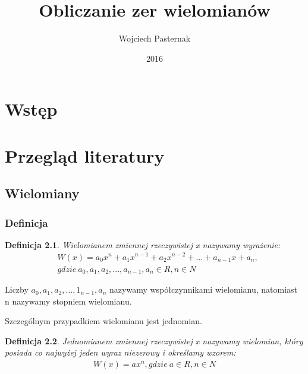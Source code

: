\documentclass[twoside,a4paper]{book}
\title{Obliczanie zer wielomianów}
\author{Wojciech Pasternak}
\date{2016}
\newtheorem{definition}{Definicja}
\begin{document}
\frontmatter
\maketitle
\tableofcontents

\mainmatter

\chapter{Wstęp}
\chapter{Przegląd literatury}
\section{Wielomiany}
\subsection{Definicja}

\begin{definition}
	Wielomianem zmiennej rzeczywistej x nazywamy wyrażenie:
	\begin{equation}
		\begin{split}
			&W(x) = a_0x^n + a_1x^{n-1} + a_2x^{n-2}+ ... + a_{n-1}x + a_n, \\
			&gdzie\ a_0, a_1, a_2, ..., a_{n-1}, a_n\in R, n \in N 
		\end{split}
	\end{equation}
\end{definition}

Liczby $a_0, a_1, a_2, ..., 1_{n-1}, a_n$ nazywamy współczynnikami wielomianu, natomiast n nazywamy stopniem wielomianu.
	
Szczególnym przypadkiem wielomianu jest jednomian. 

\begin{definition}
	Jednomianem zmiennej rzeczywistej x nazywamy wielomian, który posiada co najwyżej jeden wyraz niezerowy i określamy wzorem:
	\begin{equation}
		\begin{split}
			W(x) = ax^n, gdzie\ a\in R, n \in N 
		\end{split}
	\end{equation}
\end{definition}
\end{document}
